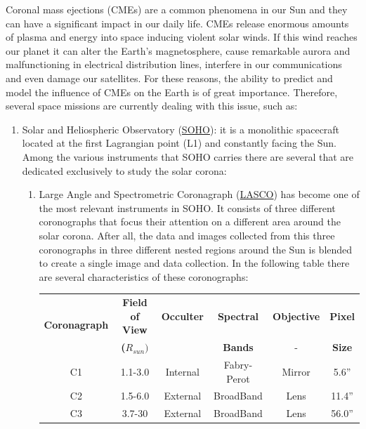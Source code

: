Coronal mass ejections (CMEs) are a common phenomena in our Sun and
they can have a significant impact in our daily life. CMEs release
enormous amounts of plasma and energy into space inducing violent
solar winds. If this wind reaches our planet it can alter the Earth's
magnetosphere, cause remarkable aurora and malfunctioning in electrical
distribution lines, interfere in our communications and even damage
our satellites. For these reasons, the ability to predict and model
the influence of CMEs on the Earth is of great importance. Therefore,
several space missions are currently dealing with this issue, such
as:
\begin{enumerate}
\item Solar and Heliospheric Observatory (\href{http://www.nasa.gov/mission_pages/soho/index.html\#.UjUrV8YagWA}{SOHO}):
it is a monolithic spacecraft located at the first Lagrangian point
(L1) and constantly facing the Sun. Among the various instruments
that SOHO carries there are several that are dedicated exclusively
to study the solar corona:

\begin{enumerate}
\item Large Angle and Spectrometric Coronagraph (\href{http://lasco-www.nrl.navy.mil/}{LASCO})
has become one of the most relevant instruments in SOHO. It consists
of three different coronographs that focus their attention on a different
area around the solar corona. After all, the data and images collected
from this three coronographs in three different nested regions around
the Sun is blended to create a single image and data collection. In
the following table there are several characteristics of these coronographs:


\begin{table}[H]
\begin{centering}
\begin{tabular}{|c|c|c|c|c|c|}
\hline 
\multirow{2}{*}{\textbf{Coronagraph}} & \textbf{Field of View} & \textbf{Occulter} & \textbf{Spectral} & \textbf{Objective} & \textbf{Pixel }\tabularnewline
 & \textbf{($R_{sun})$} &  & \textbf{ Bands} & - & \textbf{Size}\tabularnewline
\hline 
\hline 
C1 & 1.1-3.0 & Internal & Fabry-Perot & Mirror & 5.6''\tabularnewline
\hline 
C2 & 1.5-6.0 & External & BroadBand & Lens & 11.4''\tabularnewline
\hline 
C3 & 3.7-30 & External & BroadBand & Lens & 56.0''\tabularnewline
\hline 
\end{tabular}
\par\end{centering}


\end{table}
\end{enumerate}
\end{enumerate}
